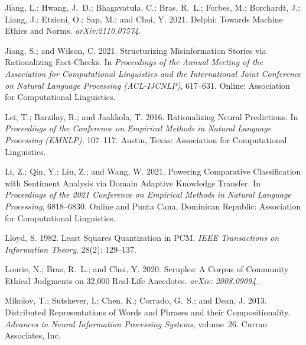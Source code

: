 \documentclass[letterpaper]{article} %
\begin{document}
\begin{thebibliography}{46}
Jiang, L.; Hwang, J.~D.; Bhagavatula, C.; Bras, R.~L.; Forbes, M.; Borchardt,
  J.; Liang, J.; Etzioni, O.; Sap, M.; and Choi, Y. 2021.
\newblock Delphi: Towards Machine Ethics and Norms.
\newblock \emph{arXiv:2110.07574}.

Jiang, S.; and Wilson, C. 2021.
\newblock Structurizing Misinformation Stories via Rationalizing Fact-Checks.
\newblock In \emph{Proceedings of the Annual Meeting of the Association for
  Computational Linguistics and the International Joint Conference on Natural
  Language Processing (ACL-IJCNLP)}, 617--631. Online: Association for
  Computational Linguistics.

Lei, T.; Barzilay, R.; and Jaakkola, T. 2016.
\newblock Rationalizing Neural Predictions.
\newblock In \emph{Proceedings of the Conference on Empirical Methods in Natural Language Processing (EMNLP)}, 107--117. Austin, Texas: Association
  for Computational Linguistics.

Li, Z.; Qin, Y.; Liu, Z.; and Wang, W. 2021.
\newblock Powering Comparative Classification with Sentiment Analysis via
  Domain Adaptive Knowledge Transfer.
\newblock In \emph{Proceedings of the 2021 Conference on Empirical Methods in
  Natural Language Processing}, 6818--6830. Online and Punta Cana, Dominican
  Republic: Association for Computational Linguistics.

Lloyd, S. 1982.
\newblock Least Squares Quantization in PCM.
\newblock \emph{IEEE Transactions on Information Theory}, 28(2): 129--137.

Lourie, N.; Bras, R.~L.; and Choi, Y. 2020.
\newblock Scruples: A Corpus of Community Ethical Judgments on 32,000 Real-Life
  Anecdotes.
\newblock \emph{arXiv: 2008.09094}.

Mikolov, T.; Sutskever, I.; Chen, K.; Corrado, G.~S.; and Dean, J. 2013.
\newblock Distributed Representations of Words and Phrases and their
  Compositionality.  \emph{Advances in Neural Information Processing
  Systems}, volume~26. Curran Associates, Inc.


\end{thebibliography}
\end{document}
